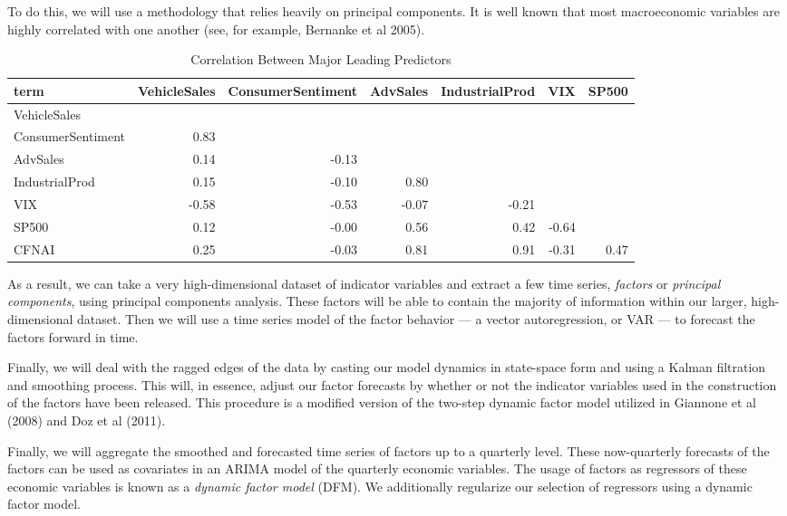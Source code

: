 \documentclass[11pt, letterpaper]{article}\usepackage[]{graphicx}\usepackage[]{color}
\begin{document}
To do this, we will use a methodology that relies heavily on principal components. It is well known that most macroeconomic variables are highly correlated with one another (see, for example, Bernanke et al 2005).
\begin{table}[H]
\centering
\begingroup\scriptsize
\begin{tabular}{lrrrrrr}
  \hline
term & VehicleSales & ConsumerSentiment & AdvSales & IndustrialProd & VIX & SP500 \\ 
  \hline
VehicleSales &  &  &  &  &  &  \\ 
  ConsumerSentiment & 0.83 &  &  &  &  &  \\ 
  AdvSales & 0.14 & -0.13 &  &  &  &  \\ 
  IndustrialProd & 0.15 & -0.10 & 0.80 &  &  &  \\ 
  VIX & -0.58 & -0.53 & -0.07 & -0.21 &  &  \\ 
  SP500 & 0.12 & -0.00 & 0.56 & 0.42 & -0.64 &  \\ 
  CFNAI & 0.25 & -0.03 & 0.81 & 0.91 & -0.31 & 0.47 \\ 
   \hline
\end{tabular}
\endgroup
\caption{Correlation Between Major Leading Predictors} 
\end{table}

As a result, we can take a very high-dimensional dataset of indicator variables and extract a few time series, \textit{factors} or \textit{principal components}, using principal components analysis. These factors will be able to contain the majority of information within our larger, high-dimensional dataset. Then we will use a time series model of the factor behavior --- a vector autoregression, or VAR --- to forecast the factors forward in time. 

Finally, we will deal with the ragged edges of the data by casting our model dynamics in state-space form and using a Kalman filtration and smoothing process. This will, in essence, adjust our factor forecasts by whether or not the indicator variables used in the construction of the factors have been released. This procedure is a modified version of the two-step dynamic factor model utilized in Giannone et al (2008) and Doz et al (2011).

Finally, we will aggregate the smoothed and forecasted time series of factors up to a quarterly level. These now-quarterly forecasts of the factors can be used as covariates in an ARIMA model of the quarterly economic variables. The usage of factors as regressors of these economic variables is known as a \textit{dynamic factor model} (DFM). We additionally regularize our selection of regressors using a dynamic factor model.
\end{document}
